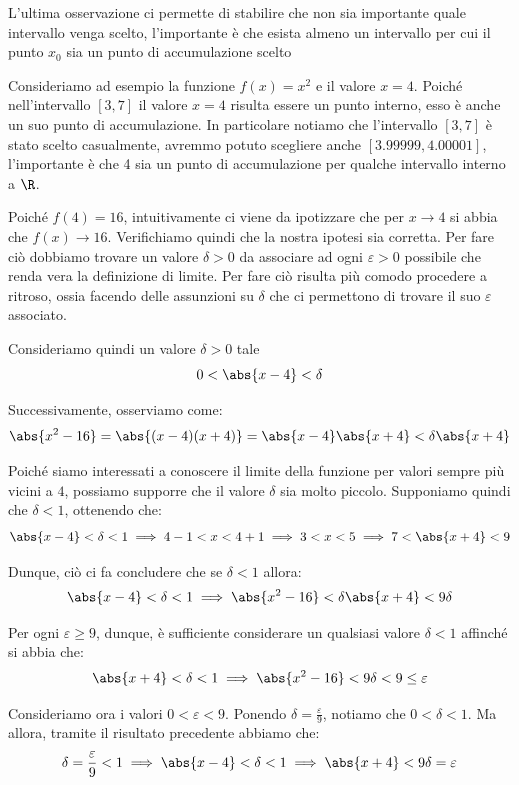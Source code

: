 \documentclass[a4paper, 12pt]{report}
\begin{document}
    L'ultima osservazione ci permette di stabilire che non sia importante quale intervallo venga scelto, l'importante è che esista almeno un intervallo per cui il punto $x_0$ sia un punto di accumulazione scelto

    Consideriamo ad esempio la funzione $f(x) = x^2$ e il valore $x = 4$. Poiché nell'intervallo $[3,7]$ il valore $x = 4$ risulta essere un punto interno, esso è anche un suo punto di accumulazione. In particolare notiamo che l'intervallo $[3,7]$ è stato scelto casualmente, avremmo potuto scegliere anche $[3.99999, 4.00001]$, l'importante è che 4 sia un punto di accumulazione per qualche intervallo interno a $\R$. 
    
    Poiché $f(4) = 16$, intuitivamente ci viene da ipotizzare che per $x \to 4$ si abbia che $f(x) \to 16$. Verifichiamo quindi che la nostra ipotesi sia corretta. Per fare ciò dobbiamo trovare un valore $\delta > 0$ da associare ad ogni $\varepsilon > 0$ possibile che renda vera la definizione di limite. Per fare ciò risulta più comodo procedere a ritroso, ossia facendo delle assunzioni su $\delta$ che ci permettono di trovare il suo $\varepsilon$ associato.

    Consideriamo quindi un valore $\delta > 0$ tale
    \[0 < \abs{x-4} < \delta\]

    Successivamente, osserviamo come:
    \[\abs{x^2-16} = \abs{(x-4)(x+4)} = \abs{x-4} \abs{x+4} < \delta \abs{x+4}\]
    
    Poiché siamo interessati a conoscere il limite della funzione per valori sempre più vicini a $4$, possiamo supporre che il valore $\delta$ sia molto piccolo. Supponiamo quindi che $\delta < 1$, ottenendo che:
    \[\abs{x-4} < \delta < 1 \implies 4-1 < x < 4+1 \implies 3 < x < 5 \implies 7 < \abs{x+4} < 9\]

    Dunque, ciò ci fa concludere che se $\delta < 1$ allora:
    \[\abs{x-4} < \delta < 1 \implies \abs{x^2-16} < \delta \abs{x+4} < 9\delta\]

    Per ogni $\varepsilon \geq 9$, dunque, è sufficiente considerare un qualsiasi valore $\delta < 1$ affinché si abbia che:
    \[\abs{x+4} < \delta < 1 \implies \abs{x^2-16} < 9\delta < 9 \leq \varepsilon\]

    Consideriamo ora i valori $0 < \varepsilon < 9$. Ponendo $\delta = \frac{\varepsilon}{9}$, notiamo che $0 < \delta < 1$. Ma allora, tramite il risultato precedente abbiamo che:
    \[\delta = \frac{\varepsilon}{9} < 1 \implies \abs{x-4} < \delta < 1 \implies \abs{x+4} < 9\delta = \varepsilon\]
\end{document}
